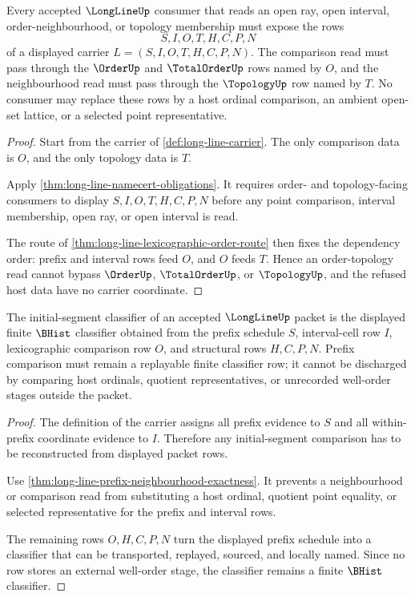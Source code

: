 \begin{theorem}
\label{thm:longline-order-topology-obligation}
Every accepted $\LongLineUp$ consumer that reads an open ray, open interval, order-neighbourhood, or topology membership must expose the rows
$$
S,I,O,T,H,C,P,N
$$
of a displayed carrier $L=(S,I,O,T,H,C,P,N)$. The comparison read must pass through the $\OrderUp$ and $\TotalOrderUp$ rows named by $O$, and the neighbourhood read must pass through the $\TopologyUp$ row named by $T$. No consumer may replace these rows by a host ordinal comparison, an ambient open-set lattice, or a selected point representative.
\end{theorem}
\begin{proof}
Start from the carrier of \autoref{def:long-line-carrier}. The only comparison data is $O$, and the only topology data is $T$.

Apply \autoref{thm:long-line-namecert-obligations}. It requires order- and topology-facing consumers to display $S,I,O,T,H,C,P,N$ before any point comparison, interval membership, open ray, or open interval is read.

The route of \autoref{thm:long-line-lexicographic-order-route} then fixes the dependency order: prefix and interval rows feed $O$, and $O$ feeds $T$. Hence an order-topology read cannot bypass $\OrderUp$, $\TotalOrderUp$, or $\TopologyUp$, and the refused host data have no carrier coordinate.
\end{proof}

\begin{theorem}
\label{thm:longline-initial-segment-classifier-obligation}
The initial-segment classifier of an accepted $\LongLineUp$ packet is the displayed finite $\BHist$ classifier obtained from the prefix schedule $S$, interval-cell row $I$, lexicographic comparison row $O$, and structural rows $H,C,P,N$. Prefix comparison must remain a replayable finite classifier row; it cannot be discharged by comparing host ordinals, quotient representatives, or unrecorded well-order stages outside the packet.
\end{theorem}
\begin{proof}
The definition of the carrier assigns all prefix evidence to $S$ and all within-prefix coordinate evidence to $I$. Therefore any initial-segment comparison has to be reconstructed from displayed packet rows.

Use \autoref{thm:long-line-prefix-neighbourhood-exactness}. It prevents a neighbourhood or comparison read from substituting a host ordinal, quotient point equality, or selected representative for the prefix and interval rows.

The remaining rows $O,H,C,P,N$ turn the displayed prefix schedule into a classifier that can be transported, replayed, sourced, and locally named. Since no row stores an external well-order stage, the classifier remains a finite $\BHist$ classifier.
\end{proof}

